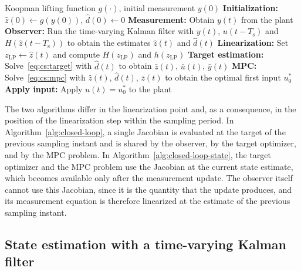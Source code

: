 \documentclass[preprint,12pt,authoryear]{elsarticle}
\theoremstyle{remark}
\newcommand{\ui}[2]{#1_{\text{#2}}}
\begin{document}
\begin{algorithm}[H]
  \caption{Closed-loop control with nonlinear output mapping and linearization at the current state estimate}
  \label{alg:closed-loop-state}
  \begin{algorithmic}[1]
    \REQUIRE Koopman lifting function $g(\cdot)$, initial measurement $y(0)$
    \STATE \textbf{Initialization:} $\hat{z}(0) \leftarrow g(y(0))$, $\hat{d}(0) \leftarrow 0$
    \LOOP
      \STATE \textbf{Measurement:} Obtain $y(t)$ from the plant
      \STATE \textbf{Observer:} Run the time-varying Kalman filter with $y(t)$, $u(t-T_\text{s})$ and $H(\hat{z}(t-T_\text{s}))$ to obtain the estimates $\hat{z}(t)$ and $\hat{d}(t)$
      \STATE \textbf{Linearization:} Set $\ui{z}{LP} \leftarrow \hat{z}(t)$ and compute $H(\ui{z}{LP})$ and $h(\ui{z}{LP})$
      \STATE \textbf{Target estimation:} Solve~\eqref{eq:cs:target} with $\hat{d}(t)$ to obtain $\bar{z}(t)$, $\bar{u}(t)$, $\bar{y}(t)$
      \STATE \textbf{MPC:} Solve~\eqref{eq:cs:mpc} with $\hat{z}(t)$, $\hat{d}(t)$, $\bar{z}(t)$ to obtain the optimal first input $u_0^*$
      \STATE \textbf{Apply input:} Apply $u(t) = u_0^*$ to the plant
    \ENDLOOP
  \end{algorithmic}
\end{algorithm}

The two algorithms differ in the linearization point and, as a consequence, in the position of the linearization step within the sampling period. In Algorithm~\ref{alg:closed-loop}, a single Jacobian is evaluated at the target of the previous sampling instant and is shared by the observer, by the target optimizer, and by the MPC problem. In Algorithm~\ref{alg:closed-loop-state}, the target optimizer and the MPC problem use the Jacobian at the current state estimate, which becomes available only after the measurement update. The observer itself cannot use this Jacobian, since it is the quantity that the update produces, and its measurement equation is therefore linearized at the estimate of the previous sampling instant.

\subsection{State estimation with a time-varying Kalman filter}
\label{sec:tvkf}
\end{document}
